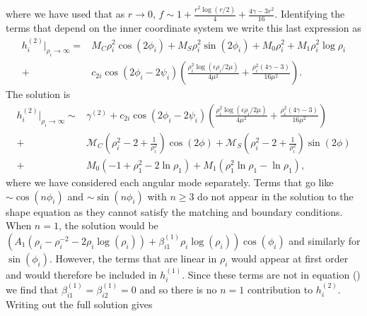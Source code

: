 where we have used that as $r \rightarrow 0$, $f \sim 1 + \frac{r^2\log(r/2)}{4} + \frac{4\gamma-3 r^2}{16}$. Identifying the terms that depend on the inner coordinate system we write this last expression as
\begin{equation}
    \begin{split}
        h_i^{(2)}\biggr\rvert_{\rho_i\to\infty} = & M_C \rho_i^2 \cos(2\phi_i) + M_S \rho_i^2 \sin(2\phi_i) + M_0\rho_i^2 + M_1\rho_i^2\log\rho_i \\
        +& c_{2i}\cos(2\phi_i-2\psi_i)\left(\frac{\rho_{i}^2\log(\epsilon\rho_{i}/2\mu)}{4\mu^2} + \frac{\rho_{i}^2(4\gamma - 3)}{16\mu^2}\right).
    \end{split}
    \label{secondinnerBCfar}
\end{equation}
The solution is
\begin{equation}
    \begin{split}
        h_i^{(2)}\biggr\rvert_{\rho_i\to\infty} \sim &  \gamma^{(2)} + c_{2i}\cos(2\phi_i-2\psi_i)\left(\frac{\rho_{i}^2\log(\epsilon\rho_{i}/2\mu)}{4\mu^2} + \frac{\rho_{i}^2(4\gamma - 3)}{16\mu^2}\right) \\
        +& \mathcal{M}_C\left(\rho_i^2-2+\frac{1}{\rho_i^2}\right)\cos(2\phi) + \mathcal{M}_S\left(\rho_i^2-2+\frac{1}{\rho_i^2}\right)\sin(2\phi)\\
        +& M_0(-1+\rho_1^2-2\ln{\rho_1})+ M_1(\rho_1^2\ln{\rho_1}-\ln{\rho_1}),
    \end{split}
\end{equation}
where we have considered each angular mode separately. Terms that go like $\sim\cos(n\phi_i)$ and $\sim\sin(n\phi_i)$ with $n \geq 3$ do not appear in the solution to the shape equation as they cannot satisfy the matching and boundary conditions. When $n=1$, the solution would be $(A_1 (\rho_i-\rho_i^{-2}-2\rho_i\log(\rho_i))+\beta_{i1}^{(1)}\rho_i\log(\rho_i))\cos(\phi_i)$ and similarly for $\sin(\phi_i)$. However, the terms that are linear in $\rho_i$ would appear at first order and would therefore be included in $h_i^{(1)}$. Since these terms are not in equation () we find that $\beta_{i1}^{(1)}=\beta_{i2}^{(1)}=0$ and so there is no $n=1$ contribution to $h_i^{(2)}$. Writing out the full solution gives
